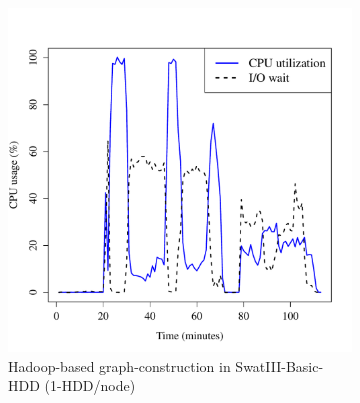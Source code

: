 \documentclass[conference]{IEEEtran}
\begin{document}
\begin{figure}[htb]
        \begin{subfigure}[b]{0.23\textwidth}
                \includegraphics[width=\textwidth]{Figure/SystemData/Plots/BGCPUHDD.pdf}
                \caption{Hadoop-based graph-construction in SwatIII-Basic-HDD (1-HDD/node)}
                \label{fig:BGCPUHDD}
        \end{subfigure}
		\begin{subfigure}[b]{0.23\textwidth}

\end{subfigure}
\end{figure}
\end{document}
